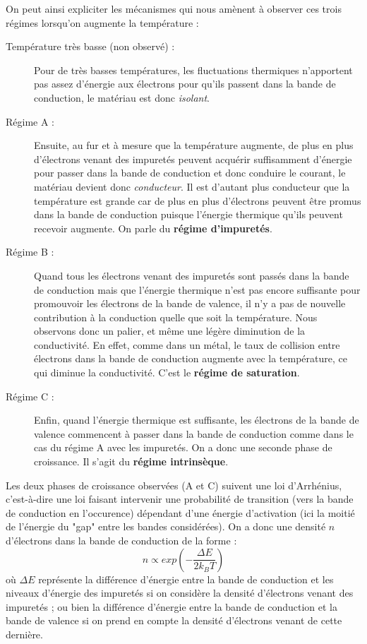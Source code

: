 On peut ainsi expliciter les mécanismes qui nous amènent à observer ces trois régimes lorsqu'on augmente la température : 
\begin{description}
\item[Température très basse (non observé) : ] Pour de très basses températures, les fluctuations thermiques n'apportent pas assez d'énergie aux électrons pour qu'ils passent dans la bande de conduction, le matériau est donc \emph{isolant}.
\item[Régime A : ] Ensuite, au fur et à mesure que la température augmente, de plus en plus d'électrons venant des 
impuretés peuvent acquérir suffisamment d'énergie pour passer dans la bande de conduction et donc conduire le courant, 
le matériau devient donc \emph{conducteur}. Il est d'autant plus conducteur que la température est grande car de plus 
en plus d'électrons peuvent être promus dans la bande de conduction puisque l'énergie thermique qu'ils peuvent recevoir
augmente. On parle du \textbf{régime d'impuretés}.
\item[Régime B : ] Quand tous les électrons venant des impuretés sont passés dans la bande de conduction 
mais que l'énergie thermique n'est pas encore suffisante pour promouvoir les électrons de la bande de valence, 
il n'y a pas de nouvelle contribution à la conduction quelle que soit la température. Nous observons donc un palier, 
et même une légère diminution de la conductivité. En effet, comme dans un métal, le taux de collision entre électrons 
dans la bande de conduction augmente avec la température, ce qui diminue la conductivité. C'est le \textbf{régime de saturation}.
\item[Régime C : ] Enfin, quand l'énergie thermique est suffisante, les électrons de la bande de valence commencent à 
passer dans la bande de conduction comme dans le cas du régime A avec les impuretés. On a donc une seconde phase de 
croissance. Il s'agit du \textbf{régime intrinsèque}.
\end{description}

Les deux phases de croissance observées (A et C) suivent une loi d'Arrhénius, c'est-à-dire une loi faisant intervenir une probabilité de transition (vers la bande de conduction en l'occurence) dépendant d'une énergie d'activation (ici la moitié de l'énergie du "gap" entre les bandes considérées). On a donc une densité $n$ d'électrons dans la bande de conduction de la forme : 
\begin{equation}
	n \propto exp \left( - \frac{\Delta E}{2 k_{B} T} \right)
\end{equation}
où $\Delta E$ représente la différence d'énergie entre la bande de conduction et les niveaux d'énergie des impuretés si on considère la densité d'électrons venant des impuretés ; ou bien la différence d'énergie entre la bande de conduction et la bande de valence si on prend en compte la densité d'électrons venant de cette dernière.

